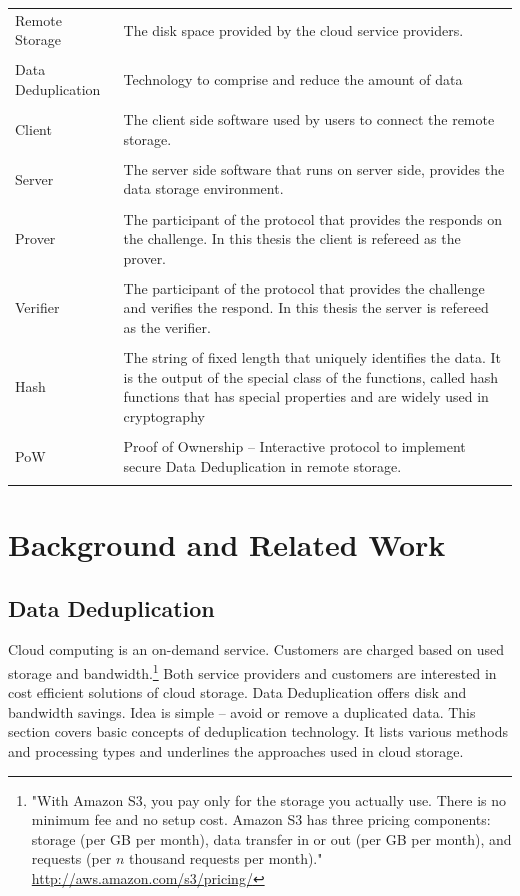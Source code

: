 \documentclass[12pt]{article}
\begin{document}
\begin{tabular}{L{4cm}L{12cm}}
Remote Storage & The disk space provided by the cloud service providers.\\\\
Data Deduplication& Technology to comprise and reduce the amount of data\\\\
Client&The client side software used by users to connect the remote storage.\\\\
Server&The server side software that runs on server side, provides the data storage environment.\\\\
Prover&The participant of the protocol that provides the responds on the challenge. In this thesis the client is refereed as the prover.\\\\
Verifier&The participant of the protocol that provides the challenge and verifies the respond. In this thesis the server is refereed as the verifier.\\\\
Hash& The string of fixed length that uniquely identifies the data. It is the output of the special class of the functions, called hash functions that has special properties and are widely used in cryptography\\\\
PoW& Proof of Ownership -- Interactive protocol to implement secure Data Deduplication in remote storage.\\\\

\end{tabular}


\pagebreak
\section{Background and Related Work}
\label{sec:3}
\subsection{Data Deduplication}
\label{sub:Deduplication}
Cloud computing is an on-demand service. Customers are charged based on used storage and bandwidth.\footnote{"With Amazon S3, you pay only for the storage you actually use. There is no minimum fee and no setup cost. Amazon S3 has three pricing components: storage (per GB per month), data transfer in or out (per GB per month), and requests (per $n$ thousand requests per month)." \url{http://aws.amazon.com/s3/pricing/}} Both service providers and customers are interested in cost efficient solutions of cloud storage. Data Deduplication offers disk and bandwidth savings. Idea is simple -- avoid or remove a duplicated data. 
This section covers basic concepts of deduplication technology. It lists various methods and processing types and underlines the approaches used in cloud storage.
\end{document}

